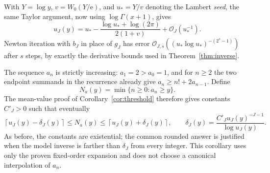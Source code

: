 \documentclass[11pt,letterpaper]{article}
\numberwithin{equation}{section}
\theoremstyle{remark}\newtheorem{remark}[theorem]{Remark}
\newcommand{\e}{\mathrm e}
\newcommand{\Ord}{\mathcal O}
\begin{document}
With $Y=\log y$, $v=W_0(Y/\e)$, and $u_*=Y/v$ denoting the Lambert \emph{seed}, the same Taylor argument, now using $\log\Gamma(x+1)$, gives
\begin{equation}\label{eq:original-inverse}
 u_J(y)=u_*-\frac{\log u_*+\log(2\pi)}{2(1+v)}
                          +\Ord_J(u_*^{-1}).
\end{equation}
Newton iteration with $b_J$ in place of $g_J$ has error
$\Ord_{J,s}((u_*\log u_*)^{-(2^s-1)})$ after $s$ steps, by exactly the derivative bounds used in Theorem~\ref{thm:inverse}.

The sequence $a_n$ is strictly increasing: $a_1=2>a_0=1$, and for $n\ge2$ the two endpoint summands in the recurrence already give $a_n\ge n!+2a_{n-1}$. Define
\[
 N_a(y)=\min\{n\ge0:a_n\ge y\}.
\]
The mean-value proof of Corollary~\ref{cor:threshold} therefore gives constants $C'_J>0$ such that eventually
\begin{equation}\label{eq:original-bracket}
 \left\lceil u_J(y)-\delta_J(y)\right\rceil
 \le N_a(y)\le
 \left\lceil u_J(y)+\delta_J(y)\right\rceil,
 \qquad
 \delta_J(y)=\frac{C'_J u_J(y)^{-J-1}}{\log u_J(y)}.
\end{equation}
As before, the constants are existential; the common rounded answer is justified when the model inverse is farther than $\delta_J$ from every integer. This corollary uses only the proven fixed-order expansion and does not choose a canonical interpolation of $a_n$.
\end{document}
